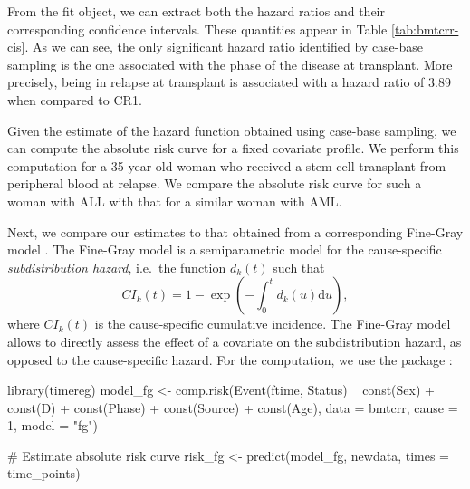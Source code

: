 From the fit object, we can extract both the hazard ratios and their
corresponding confidence intervals. These quantities appear in Table
\ref{tab:bmtcrr-cis}. As we can see, the only significant hazard ratio
identified by case-base sampling is the one associated with the phase of
the disease at transplant. More precisely, being in relapse at
transplant is associated with a hazard ratio of 3.89 when compared to
CR1.

Given the estimate of the hazard function obtained using case-base
sampling, we can compute the absolute risk curve for a fixed covariate
profile. We perform this computation for a 35 year old woman who
received a stem-cell transplant from peripheral blood at relapse. We
compare the absolute risk curve for such a woman with ALL with that for
a similar woman with AML.

Next, we compare our estimates to that obtained from a corresponding
Fine-Gray model \citeyearpar{fine1999proportional}. The Fine-Gray model
is a semiparametric model for the cause-specific \emph{subdistribution
hazard}, i.e.~the function \(d_k(t)\) such that
\[CI_k(t) =1 - \exp\left( - \int_0^t d_k(u) \textrm{d}u \right),\] where
\(CI_k(t)\) is the cause-specific cumulative incidence. The Fine-Gray
model allows to directly assess the effect of a covariate on the
subdistribution hazard, as opposed to the cause-specific hazard. For the
computation, we use the  package \citep{timereg}:

\begin{Schunk}
\begin{Sinput}
library(timereg)
model_fg <- comp.risk(Event(ftime, Status) ~ const(Sex) + const(D) +
                        const(Phase) + const(Source) + const(Age),
                      data = bmtcrr, cause = 1, model = "fg")

# Estimate absolute risk curve
risk_fg <- predict(model_fg, newdata, times = time_points)
\end{Sinput}
\end{Schunk}

